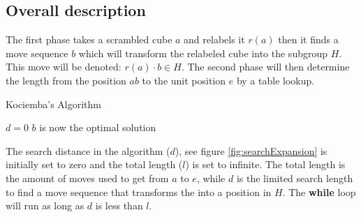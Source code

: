 \subsection{Overall description}
\label{sub:overallDescription}
The first phase takes a scrambled cube $a$ and relabels it $r(a)$ then it finds a move sequence $b$ which will transform the relabeled cube into the subgroup $H$. This move will be denoted: $r(a)\cdot{}b \in H$. The second phase will then determine the length from the position $ab$ to the unit position $e$ by a table lookup. 


\begin{algorithm}[!h]                     
\caption{Kociemba's Algorithm \cite{rokicki09}}          
\label{alg:kociemba}        
\begin{algorithmic}[1]
\STATE $d=0$
			\ENDIF
		\ENDIF
	\ENDFOR
\ENDWHILE
\STATE $b$ is now the optimal solution
\end{algorithmic}
\end{algorithm}

The search distance in the algorithm ($d$), see figure \ref{fig:searchExpansion} is initially set to zero and the total length ($l$) is set to infinite. The total length is the amount of moves used to get from $a$ to $e$, while $d$ is the limited search length to find a move sequence that transforms the \rubik{} into a position in $H$. 
The \textbf{while} loop will run as long as $d$ is less than $l$.

